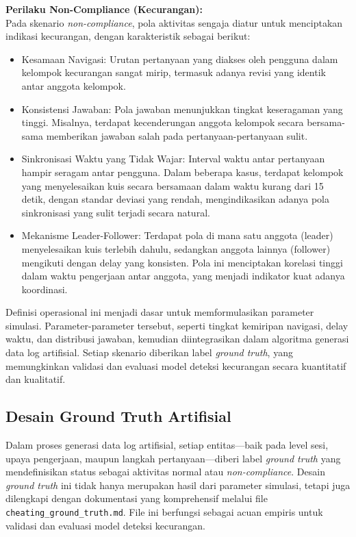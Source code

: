 \textbf{Perilaku Non-Compliance (Kecurangan):} \\
Pada skenario \textit{non-compliance}, pola aktivitas sengaja diatur untuk menciptakan indikasi kecurangan, dengan karakteristik sebagai berikut:
\begin{itemize}
    \item Kesamaan Navigasi: Urutan pertanyaan yang diakses oleh pengguna dalam kelompok kecurangan sangat mirip, termasuk adanya revisi yang identik antar anggota kelompok.
    \item Konsistensi Jawaban: Pola jawaban menunjukkan tingkat keseragaman yang tinggi. Misalnya, terdapat kecenderungan anggota kelompok secara bersama-sama memberikan jawaban salah pada pertanyaan-pertanyaan sulit.
    \item Sinkronisasi Waktu yang Tidak Wajar: Interval waktu antar pertanyaan hampir seragam antar pengguna. Dalam beberapa kasus, terdapat kelompok yang menyelesaikan kuis secara bersamaan dalam waktu kurang dari 15 detik, dengan standar deviasi yang rendah, mengindikasikan adanya pola sinkronisasi yang sulit terjadi secara natural.
    \item Mekanisme Leader-Follower: Terdapat pola di mana satu anggota (leader) menyelesaikan kuis terlebih dahulu, sedangkan anggota lainnya (follower) mengikuti dengan delay yang konsisten. Pola ini menciptakan korelasi tinggi dalam waktu pengerjaan antar anggota, yang menjadi indikator kuat adanya koordinasi.
\end{itemize}

Definisi operasional ini menjadi dasar untuk memformulasikan parameter simulasi. Parameter-parameter tersebut, seperti tingkat kemiripan navigasi, delay waktu, dan distribusi jawaban, kemudian diintegrasikan dalam algoritma generasi data log artifisial. Setiap skenario diberikan label \textit{ground truth}, yang memungkinkan validasi dan evaluasi model deteksi kecurangan secara kuantitatif dan kualitatif.

\subsection{Desain Ground Truth Artifisial}
\label{sec:desainGroundTruthArtifisial}
Dalam proses generasi data log artifisial, setiap entitas—baik pada level sesi, upaya pengerjaan, maupun langkah pertanyaan—diberi label \textit{ground truth} yang mendefinisikan status sebagai aktivitas normal atau \textit{non-compliance}. Desain \textit{ground truth} ini tidak hanya merupakan hasil dari parameter simulasi, tetapi juga dilengkapi dengan dokumentasi yang komprehensif melalui file \texttt{cheating\_ground\_truth.md}. File ini berfungsi sebagai acuan empiris untuk validasi dan evaluasi model deteksi kecurangan.

